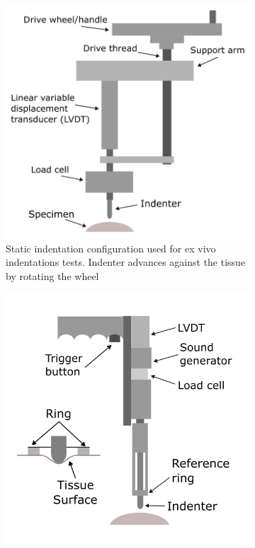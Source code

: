 \begin{figure}
        \centering
        \begin{subfigure}[b]{0.45\textwidth}
        \centering
        \includegraphics[width=\textwidth]{Images/chapter1/indentation1carter.png}
        \caption{Static indentation configuration used for ex vivo indentations tests. Indenter advances against the tissue by rotating the wheel}
        \label{fig:carter1}
        \end{subfigure}
        \hfill
        \begin{subfigure}[b]{0.45\textwidth}
        \centering
        \includegraphics[width=\textwidth]{Images/chapter1/indentation2carter.png}

\end{subfigure}
\end{figure}
